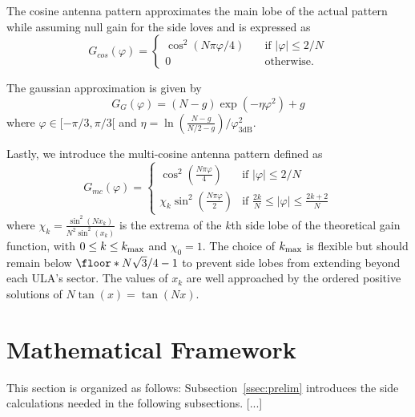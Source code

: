 The cosine antenna pattern \cite{yu2017} approximates the main lobe of the actual pattern while assuming null gain for the side loves and is expressed as
\begin{equation}\label{eq:Gcos}G_{cos}(\varphi) = \left\{
    \begin{array}{ll}
    \cos^2\left(N \pi \varphi/4\right)   \quad  & \text{if  } |\varphi|\leq 2/N\\
    0    \quad &  \text{otherwise.}
    \end{array}\right.
\end{equation}

The gaussian approximation is given by
\begin{equation}\label{eq:GG}
    G_{G}(\varphi) = (N - g) \exp(-\eta \varphi^2)+g
\end{equation}where $\varphi \in [-\pi/3, \pi/3[$ and $\eta = \ln\left(\frac{N-g}{N/2-g}\right)/\varphi_{3\text{dB}}^2$.

Lastly, we introduce the multi-cosine antenna pattern defined as
{\smalltonormalsize
\begin{equation}\label{eq:Gmc}G_{mc}(\varphi) = \left\{
    \begin{array}{ll}
    \!\cos^2\!\left(\frac{N \pi \varphi}{4}\right)  \!   & \text{if  } |\varphi|\leq 2/N\\
    \!\chi_k \sin^2\!\left(\frac{N \pi \varphi}{2}\right)  \!   & \text{if  } \frac{2 k}{N}\!\leq\!|\varphi|\!\leq \!\frac{2 k+2}{N}
    \end{array}\right.
\end{equation}} where $\chi_k = \frac{\sin^2(N x_k)}{N^2 \sin^2(x_k)}$ is the extrema of the $k$th side lobe of the theoretical gain function, with $0 \leq k \leq k_{\textrm{\normalfont max}}$ and $\chi_0\! = \!1$. The choice of $k_{\textrm{\normalfont max}}$ is flexible but should remain below $\floor*{N \sqrt{3}/4-1}$ to prevent side lobes from extending beyond each ULA's sector. The values of $x_k$ are well approached by the ordered positive solutions of $N \tan(x) = \tan(N x)$.



\section{Mathematical Framework}
\label{sec:analytical_results}

This section is organized as follows: Subsection~\ref{ssec:prelim} introduces the side calculations needed in the following subsections. [...]

